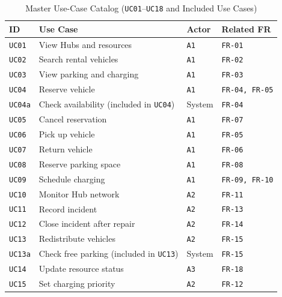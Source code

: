\begin{table}[H]
  \centering
  \singlespacing\footnotesize
  \caption{Master Use-Case Catalog (\texttt{UC01}--\texttt{UC18} and Included Use Cases)}
  \label{tab:uc-catalog}
  \renewcommand{\arraystretch}{1.14}
  \begin{tabularx}{\textwidth}{|C{1.5cm}|Y|C{2.1cm}|L{2.8cm}|}
    \hline
    \textbf{ID} & \textbf{Use Case} & \textbf{Actor} & \textbf{Related FR} \\
    \hline
    \texttt{UC01} & View Hubs and resources & \texttt{A1} & \texttt{FR-01} \\
    \hline
    \texttt{UC02} & Search rental vehicles & \texttt{A1} & \texttt{FR-02} \\
    \hline
    \texttt{UC03} & View parking and charging & \texttt{A1} & \texttt{FR-03} \\
    \hline
    \texttt{UC04} & Reserve vehicle & \texttt{A1} & \texttt{FR-04, FR-05} \\
    \hline
    \texttt{UC04a} & Check availability (included in \texttt{UC04}) & System & \texttt{FR-04} \\
    \hline
    \texttt{UC05} & Cancel reservation & \texttt{A1} & \texttt{FR-07} \\
    \hline
    \texttt{UC06} & Pick up vehicle & \texttt{A1} & \texttt{FR-05} \\
    \hline
    \texttt{UC07} & Return vehicle & \texttt{A1} & \texttt{FR-06} \\
    \hline
    \texttt{UC08} & Reserve parking space & \texttt{A1} & \texttt{FR-08} \\
    \hline
    \texttt{UC09} & Schedule charging & \texttt{A1} & \texttt{FR-09, FR-10} \\
    \hline
    \texttt{UC10} & Monitor Hub network & \texttt{A2} & \texttt{FR-11} \\
    \hline
    \texttt{UC11} & Record incident & \texttt{A2} & \texttt{FR-13} \\
    \hline
    \texttt{UC12} & Close incident after repair & \texttt{A2} & \texttt{FR-14} \\
    \hline
    \texttt{UC13} & Redistribute vehicles & \texttt{A2} & \texttt{FR-15} \\
    \hline
    \texttt{UC13a} & Check free parking (included in \texttt{UC13}) & System & \texttt{FR-15} \\
    \hline
    \texttt{UC14} & Update resource status & \texttt{A3} & \texttt{FR-18} \\
    \hline
    \texttt{UC15} & Set charging priority & \texttt{A2} & \texttt{FR-12} \\

\end{tabularx}
\end{table}
